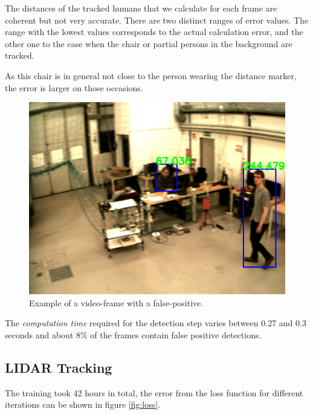 \documentclass[a4paper]{article}
\begin{document}
The distances of the tracked humans that we calculate for each frame are coherent
but not very accurate. There are two distinct ranges of error values.
The range with the lowest values corresponds to the actual calculation error, and the other one to the case when the chair or partial persons in the background are tracked.

As this chair is in general not close to the person wearing the distance marker,
the error is larger on those occasions.

\begin{figure}[H]
\centering
  \begin{minipage}[]{0.7\textwidth}
    \centering
    \includegraphics[width=\textwidth]{figures/example-frame.png}
  \end{minipage}
  \label{fig:fp-frame}
    \caption{Example of a video-frame with a false-positive.}
\end{figure}

The \emph{computation time} required for the detection step varies between
0.27 and 0.3 seconds and about 8\% of the frames contain false positive detections.

\subsection{LIDAR Tracking}

The training took 42 hours in total, the error from the loss function for different iterations can be shown in figure \ref{fig:loss}.
\end{document}
